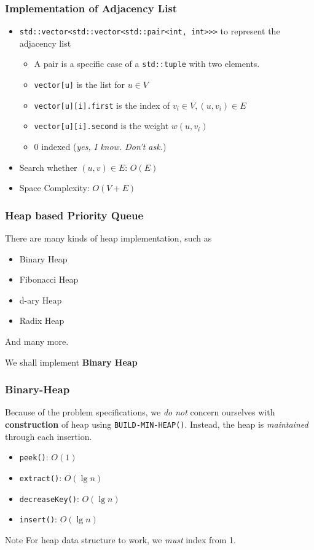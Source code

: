 \documentclass{beamer}
\begin{document}
\begin{frame}
	\frametitle{Implementation of Adjacency List}
	\begin{itemize}
		\item \texttt{std::vector<std::vector<std::pair<int, int>>>} to represent the adjacency list
		\begin{itemize}
			\item A pair is a specific case of a \texttt{std::tuple} with two elements.
			\item \texttt{vector[u]} is the list for \( u \in V \) 
			\item \texttt{vector[u][i].first} is the index of \( v_i \in V, (u, v_i) \in E \) 
			\item \texttt{vector[u][i].second} is the weight \( w(u, v_i) \) 	
			\item 0 indexed (\emph{yes, I know. Don't ask.})
		\end{itemize}
		\item Search whether \( (u, v) \in E \): \( O(E) \)  
		\item Space Complexity: \( O(V+E) \) 
	\end{itemize}
\end{frame}

\begin{frame}
	\frametitle{Heap based Priority Queue}
	There are many kinds of heap implementation, such as
	\begin{itemize}
		\item Binary Heap
		\item Fibonacci Heap
		\item d-ary Heap
		\item Radix Heap
	\end{itemize}
	And many more. \newline

	We shall implement \textbf{Binary Heap} 
\end{frame}

\begin{frame}
	\frametitle{Binary-Heap}
	Because of the problem specifications, we \emph{do not} concern ourselves with \textbf{construction} of heap using \texttt{BUILD-MIN-HEAP()}. Instead, the heap is \emph{maintained} through each insertion.
	\begin{itemize}
		\item \texttt{peek()}: \( O(1) \) 
		\item \texttt{extract()}: \( O(\lg{n}) \) 
		\item \texttt{decreaseKey()}: \( O(\lg{n}) \) 
		\item \texttt{insert()}: \( O(\lg{n}) \) 
	\end{itemize}

	\begin{block}{Note}
		For heap data structure to work, we \emph{must} index from 1.	
	\end{block}
\end{frame}
\end{document}
